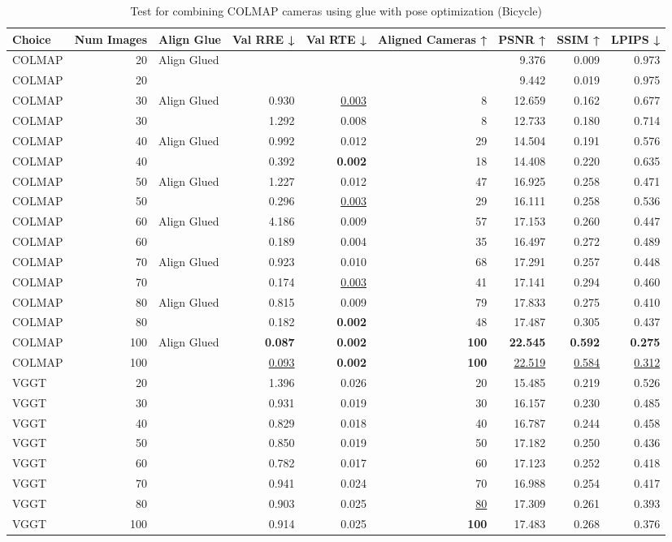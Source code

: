 \begin{table}[H]
\caption{Test for combining COLMAP cameras using glue with pose optimization (Bicycle)}
\label{tab:99_align_glue_pose_opt_bicycle}
\begin{tabular}{lrlrrrrrr}
\toprule
Choice & Num Images & Align Glue & Val RRE ↓ & Val RTE ↓ & Aligned Cameras ↑ & PSNR ↑ & SSIM ↑ & LPIPS ↓ \\
\midrule
COLMAP & 20 & Align Glued &  &  &  & 9.376 & 0.009 & 0.973 \\
COLMAP & 20 &  &  &  &  & 9.442 & 0.019 & 0.975 \\
COLMAP & 30 & Align Glued & 0.930 & \underline{0.003} & 8 & 12.659 & 0.162 & 0.677 \\
COLMAP & 30 &  & 1.292 & 0.008 & 8 & 12.733 & 0.180 & 0.714 \\
COLMAP & 40 & Align Glued & 0.992 & 0.012 & 29 & 14.504 & 0.191 & 0.576 \\
COLMAP & 40 &  & 0.392 & \textbf{0.002} & 18 & 14.408 & 0.220 & 0.635 \\
COLMAP & 50 & Align Glued & 1.227 & 0.012 & 47 & 16.925 & 0.258 & 0.471 \\
COLMAP & 50 &  & 0.296 & \underline{0.003} & 29 & 16.111 & 0.258 & 0.536 \\
COLMAP & 60 & Align Glued & 4.186 & 0.009 & 57 & 17.153 & 0.260 & 0.447 \\
COLMAP & 60 &  & 0.189 & 0.004 & 35 & 16.497 & 0.272 & 0.489 \\
COLMAP & 70 & Align Glued & 0.923 & 0.010 & 68 & 17.291 & 0.257 & 0.448 \\
COLMAP & 70 &  & 0.174 & \underline{0.003} & 41 & 17.141 & 0.294 & 0.460 \\
COLMAP & 80 & Align Glued & 0.815 & 0.009 & 79 & 17.833 & 0.275 & 0.410 \\
COLMAP & 80 &  & 0.182 & \textbf{0.002} & 48 & 17.487 & 0.305 & 0.437 \\
COLMAP & 100 & Align Glued & \textbf{0.087} & \textbf{0.002} & \textbf{100} & \textbf{22.545} & \textbf{0.592} & \textbf{0.275} \\
COLMAP & 100 &  & \underline{0.093} & \textbf{0.002} & \textbf{100} & \underline{22.519} & \underline{0.584} & \underline{0.312} \\
VGGT & 20 &  & 1.396 & 0.026 & 20 & 15.485 & 0.219 & 0.526 \\
VGGT & 30 &  & 0.931 & 0.019 & 30 & 16.157 & 0.230 & 0.485 \\
VGGT & 40 &  & 0.829 & 0.018 & 40 & 16.787 & 0.244 & 0.458 \\
VGGT & 50 &  & 0.850 & 0.019 & 50 & 17.182 & 0.250 & 0.436 \\
VGGT & 60 &  & 0.782 & 0.017 & 60 & 17.123 & 0.252 & 0.418 \\
VGGT & 70 &  & 0.941 & 0.024 & 70 & 16.988 & 0.254 & 0.417 \\
VGGT & 80 &  & 0.903 & 0.025 & \underline{80} & 17.309 & 0.261 & 0.393 \\
VGGT & 100 &  & 0.914 & 0.025 & \textbf{100} & 17.483 & 0.268 & 0.376 \\
\bottomrule
\end{tabular}
\end{table}
